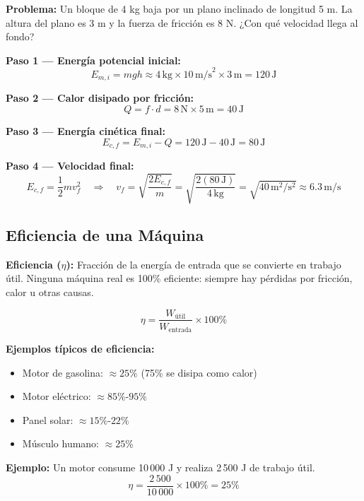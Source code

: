 \begin{seccion}
\textbf{Problema:} Un bloque de 4 kg baja por un plano inclinado de longitud 5 m. La altura del plano es 3 m y la fuerza de fricción es 8 N. ¿Con qué velocidad llega al fondo?

\textbf{Paso 1 --- Energía potencial inicial:}
$$E_{m,i} = mgh \approx 4\,\text{kg} \times 10\,\text{m/s}^2 \times 3\,\text{m} = 120\,\text{J}$$

\textbf{Paso 2 --- Calor disipado por fricción:}
$$Q = f \cdot d = 8\,\text{N} \times 5\,\text{m} = 40\,\text{J}$$

\textbf{Paso 3 --- Energía cinética final:}
$$E_{c,f} = E_{m,i} - Q = 120\,\text{J} - 40\,\text{J} = 80\,\text{J}$$

\textbf{Paso 4 --- Velocidad final:}
$$E_{c,f} = \frac{1}{2}mv_f^2 \quad \Rightarrow \quad v_f = \sqrt{\frac{2E_{c,f}}{m}} = \sqrt{\frac{2(80\,\text{J})}{4\,\text{kg}}} = \sqrt{40\,\text{m}^2/\text{s}^2} \approx 6.3\,\text{m/s}$$
\end{seccion}

\subsection{Eficiencia de una Máquina}

\begin{seccion}
\begin{definicion}
    \textbf{Eficiencia ($\eta$):} Fracción de la energía de entrada que se convierte en trabajo útil. Ninguna máquina real es 100\% eficiente: siempre hay pérdidas por fricción, calor u otras causas.
\end{definicion}

\begin{ecuacion}
$$\eta = \frac{W_{\text{útil}}}{W_{\text{entrada}}} \times 100\%$$
\end{ecuacion}

\textbf{Ejemplos típicos de eficiencia:}
\begin{itemize}
    \item Motor de gasolina: $\approx 25\%$ (75\% se disipa como calor)
    \item Motor eléctrico: $\approx 85\%$-$95\%$
    \item Panel solar: $\approx 15\%$-$22\%$
    \item Músculo humano: $\approx 25\%$
\end{itemize}

\textbf{Ejemplo:} Un motor consume 10\,000 J y realiza 2\,500 J de trabajo útil.
$$\eta = \frac{2\,500}{10\,000} \times 100\% = 25\%$$
\end{seccion}

